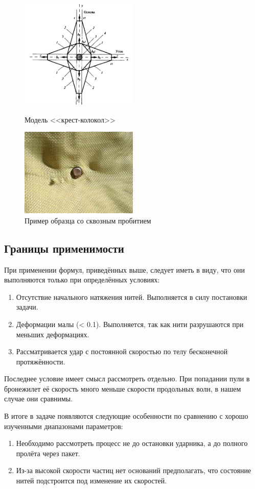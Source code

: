 \begin{figure}[H]
    \centering

    \label{fig:bell-cross}
    \includegraphics[width=0.5\textwidth]{img/bell_cross_model.png}
    \caption{Модель <<крест-колокол>>}

    \label{fig:bell-cross-example}
    \includegraphics[width=0.5\textwidth]{img/bell_cross_example.png}
    \caption{Пример образца со сквозным пробитием}
\end{figure}

\subsection{Границы применимости}\label{sec:eq-application}
При применении формул, приведённых выше, следует иметь в виду, что они выполняются только при определённых условиях:

\begin{enumerate}
    \item Отсутствие начального натяжения нитей.
Выполняется в силу постановки задачи.
    \item Деформации малы (< 0.1).
Выполняется, так как нити разрушаются при меньших деформациях.
    \item Рассматривается удар с постоянной скоростью по телу бесконечной протяжённости.
\end{enumerate}

Последнее условие имеет смысл рассмотреть отдельно.
При попадании пули в бронежилет её скорость много меньше скорости продольных волн, в нашем случае они сравнимы.

В итоге в задаче появляются следующие особенности по сравнению с хорошо изученными диапазонами параметров:
\begin{enumerate}
    \item Необходимо рассмотреть процесс не до остановки ударника, а до полного пролёта через пакет.
    \item Из-за высокой скорости частиц нет оснований предполагать, что состояние нитей подстроится под изменение их скоростей.
\end{enumerate}
